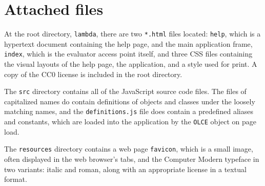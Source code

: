 \documentclass[table, a4paper, 10pt]{article}
\begin{document}
\section{Attached files}\label{dix:files}
\vspace{1cm}
\begin{multicols}{2}
\noindent
At the root directory, \texttt{lambda}, there are two \texttt{*.html}
files located: \texttt{help}, which is a hypertext document containing the
help page, and the main application frame, \texttt{index}, which is
the evaluator access point itself, and three CSS files containing
the visual layouts of the help page, the application, and a style
used for print. A copy of the CC0 license is included in the root directory.

The \texttt{src} directory contains all of the JavaScript source code files.
The files of capitalized names do contain definitions of objects and classes under
the loosely matching names, and the \texttt{definitions.js} file
does contain a predefined aliases and constants, which are
loaded into the application by the \texttt{OLCE} object on page load.

The \texttt{resources} directory contains a web page \texttt{favicon},
which is a small image, often displayed in the web browser's tabs,
and the Computer Modern typeface in two variants: italic and roman, along with an
appropriate license in a textual format.
\columnbreak
\DTsetlength{0.2em}{1em}{0.2em}{0.7pt}{0cm}
\end{multicols}

\clearpage
\printbibliography
\end{document}
